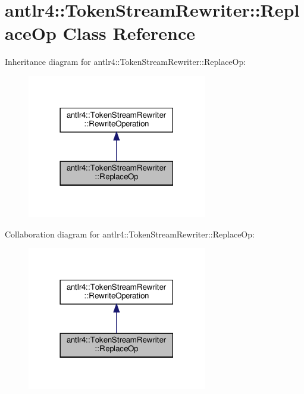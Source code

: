 \hypertarget{classantlr4_1_1TokenStreamRewriter_1_1ReplaceOp}{}\section{antlr4\+:\+:Token\+Stream\+Rewriter\+:\+:Replace\+Op Class Reference}
\label{classantlr4_1_1TokenStreamRewriter_1_1ReplaceOp}


Inheritance diagram for antlr4\+:\+:Token\+Stream\+Rewriter\+:\+:Replace\+Op\+:
\nopagebreak
\begin{figure}[H]
\begin{center}
\leavevmode
\includegraphics[width=222pt]{classantlr4_1_1TokenStreamRewriter_1_1ReplaceOp__inherit__graph}
\end{center}
\end{figure}


Collaboration diagram for antlr4\+:\+:Token\+Stream\+Rewriter\+:\+:Replace\+Op\+:
\nopagebreak
\begin{figure}[H]
\begin{center}
\leavevmode
\includegraphics[width=222pt]{classantlr4_1_1TokenStreamRewriter_1_1ReplaceOp__coll__graph}
\end{center}
\end{figure}
